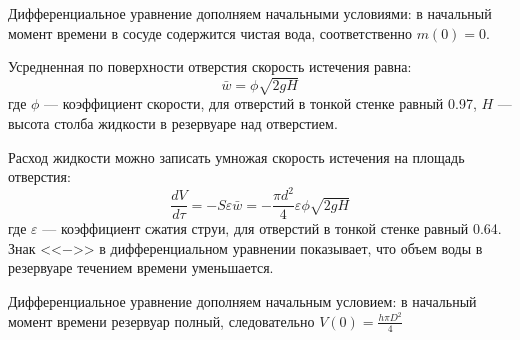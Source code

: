 Дифференциальное уравнение дополняем начальными условиями: в начальный момент времени в сосуде содержится чистая вода, соответственно $m(0)=0.$


Усредненная по поверхности отверстия скорость истечения равна:
\begin{equation}
\bar{w}=\phi \sqrt{2gH}
\end{equation} 
где $\phi$ --- коэффициент скорости, для отверстий в тонкой стенке равный 0.97, $H$ --- высота столба жидкости в резервуаре над отверстием.

Расход жидкости можно записать умножая скорость истечения на площадь отверстия:
\begin{equation}
\dfrac{d V}{d \tau} = - S  \varepsilon \bar{w}= -\dfrac{\pi d^2}{4} \varepsilon  \phi \sqrt{2gH}
\end{equation}
где $\varepsilon$ --- коэффициент сжатия струи, для отверстий в тонкой стенке равный 0.64. Знак  <<$-$>> в дифференциальном уравнении показывает,  что объем воды в резервуаре течением времени уменьшается. 

Дифференциальное уравнение дополняем начальным условием: в начальный момент времени резервуар полный, следовательно $V(0)=\frac{h \pi D^2}{4}$



